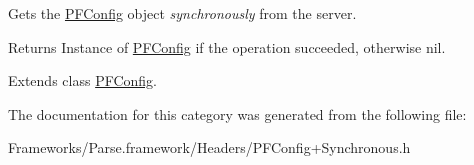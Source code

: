  





Gets the {\ttfamily \hyperlink{interface_p_f_config}{P\+F\+Config}} object {\itshape synchronously} from the server.

\begin{DoxyReturn}{Returns}
Instance of {\ttfamily \hyperlink{interface_p_f_config}{P\+F\+Config}} if the operation succeeded, otherwise {\ttfamily nil}. 
\end{DoxyReturn}


Extends class \hyperlink{interface_p_f_config_a5428cf4c7686dd9c214a6fee6dcf28f6}{P\+F\+Config}.



The documentation for this category was generated from the following file\+:\begin{DoxyCompactItemize}
\item 
Frameworks/\+Parse.\+framework/\+Headers/P\+F\+Config+\+Synchronous.\+h\end{DoxyCompactItemize}
